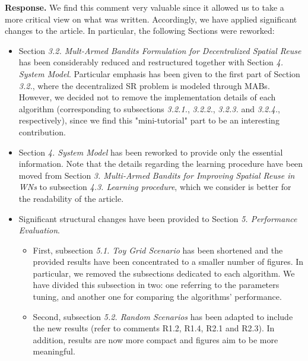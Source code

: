 \documentclass[a4paper,twoside,11pt]{reviewresponse}
\begin{document}
\textbf{Response.} We find this comment very valuable since it allowed us to take a more critical view on what was written. Accordingly, we have applied significant changes to the article. In particular, the following Sections were reworked:
\begin{itemize}
    \item Section \textit{3.2. Mult-Armed Bandits Formulation for Decentralized Spatial Reuse} has been considerably reduced and restructured together with Section \textit{4. System Model}. Particular emphasis has been given to the first part of Section \textit{3.2.}, where the decentralized SR problem is modeled through MABs. However, we decided not to remove the implementation details of each algorithm (corresponding to subsections \textit{3.2.1.}, \textit{3.2.2.}, \textit{3.2.3.} and \textit{3.2.4.}, respectively), since we find this "mini-tutorial" part to be an interesting contribution.
    \item Section \textit{4. System Model} has been reworked to provide only the essential information. Note that the details regarding the learning procedure have been moved from Section \textit{3. Multi-Armed Bandits for Improving Spatial Reuse in WNs} to subsection \textit{4.3. Learning procedure}, which we consider is better for the readability of the article.
    \item Significant structural changes have been provided to Section \textit{5. Performance Evaluation}. \begin{itemize}
        \item First, subsection \textit{5.1. Toy Grid Scenario} has been shortened and the provided results have been concentrated to a smaller number of figures. In particular, we removed the subsections dedicated to each algorithm. We have divided this subsection in two: one referring to the parameters tuning, and another one for comparing the algorithms' performance. 
        \item Second, subsection \textit{5.2. Random Scenarios} has been adapted to include the new results (refer to comments R1.2, R1.4, R2.1 and R2.3). In addition, results are now more compact and figures aim to be more meaningful.
    \end{itemize} 
\end{itemize}

\end{document}
